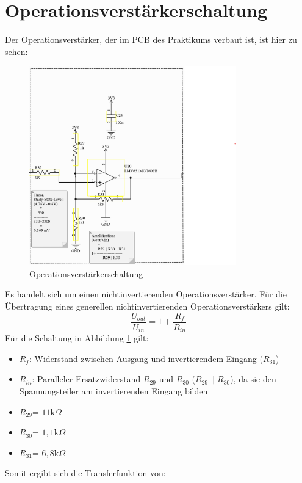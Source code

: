 \section{Operationsverstärkerschaltung} %
Der Operationsverstärker, der im PCB des Praktikums verbaut ist, ist hier zu sehen:
\begin{figure}[H]
    \centering
    \includegraphics[width=0.8\textwidth]{Pictures/OP_Verstaerker.png}
    \caption{Operationsverstärkerschaltung}
    \label{fig:opamp_schaltung}
\end{figure}
Es handelt sich um einen nichtinvertierenden Operationsverstärker.
Für die Übertragung eines generellen nichtinvertierenden Operationsverstärkers gilt:
\begin{equation}
    \frac{U_{out}}{U_{in}} = 1 + \frac{R_f}{R_{in}}
\end{equation}
Für die Schaltung in Abbildung \ref{fig:opamp_schaltung} gilt:
\begin{itemize}
    \item $R_f$: Widerstand zwischen Ausgang und invertierendem Eingang ($R_{31}$)
    \item $R_{in}$: Paralleler Ersatzwiderstand $R_{29}$ und $R_{30}$ ($R_{29}\parallel R_{30}$), da sie den Spannungsteiler am invertierenden Eingang bilden
    \item $R_{29}$= $11 \mathrm{k}\Omega$
    \item $R_{30}$= $1,1 \mathrm{k}\Omega$
    \item $R_{31}$= $6,8 \mathrm{k}\Omega$
\end{itemize}
Somit ergibt sich die Transferfunktion von:
